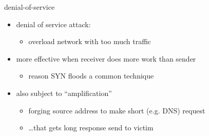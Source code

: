 \begin{frame}{denial-of-service}
    \begin{itemize}
    \item denial of service attack:
        \begin{itemize}
        \item overload network with too much traffic
        \end{itemize}
    \item more effective when receiver does more work than sender
        \begin{itemize}
        \item reason SYN floods a common technique
        \end{itemize}
    \vspace{.5cm}
    \item also subject to ``amplification''
        \begin{itemize}
        \item forging source address to make short (e.g. DNS) request
        \item \ldots that gets long response send to victim
        \end{itemize}
    \end{itemize}
\end{frame}
